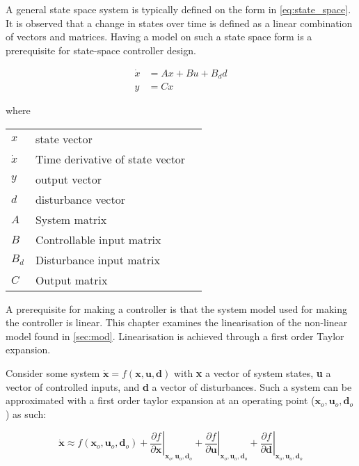 A general state space system is typically defined on the form in \cref{eq:state_space}. It is observed that a change in states over time is defined as a linear combination of vectors and matrices. Having a model on such a state space form is a prerequisite for state-space controller design.

\begin{equation} \label{eq:state_space}
	\begin{split}
		\dot{x} & = Ax + Bu + B_dd \\
		y 		& = Cx
	\end{split}
\end{equation}

where


\begin{center}
	\begin{tabular}{l p{8cm} l}
		$x$       & state vector                    &  \\
		$\dot{x}$ & Time derivative of state vector &  \\
		$y$       & output vector                   &  \\
		$d$       & disturbance vector              &  \\
		$A$       & System matrix                   &  \\
		$B$       & Controllable input matrix       &  \\
		$B_d$       & Disturbance input matrix        &  \\
		$C$       & Output matrix                   &
	\end{tabular}
\end{center}

A prerequisite for making a controller is that the system model used for making the controller is linear. This chapter examines the linearisation of the non-linear model found in \cref{sec:mod}. Linearisation is achieved through a first order Taylor expansion.

Consider some system $\dot{\textbf{x}} = f(\textbf{x},\textbf{u},\textbf{d})$ with \textbf{x} a vector of system states, \textbf{u} a vector of controlled inputs, and \textbf{d} a vector of disturbances. Such a system can be approximated with a first order taylor expansion at an operating point ($\textbf{x}_o, \textbf{u}_o, \textbf{d}_o$) as such:




\begin{equation} \label{eq:taylor}
	\dot{\textbf{x}}   \approx   f(\textbf{x}_o, \textbf{u}_o, \textbf{d}_o)   +   \left. \dfrac{\partial f}{\partial \textbf{x}} \right |_{\textbf{x}_o, \textbf{u}_o, \textbf{d}_o} + \left. \dfrac{\partial f}{\partial \textbf{u}} \right |_{\textbf{x}_o, \textbf{u}_o, \textbf{d}_o} + \left. \dfrac{\partial f}{\partial \textbf{d}} \right |_{\textbf{x}_o, \textbf{u}_o, \textbf{d}_o}
\end{equation}

